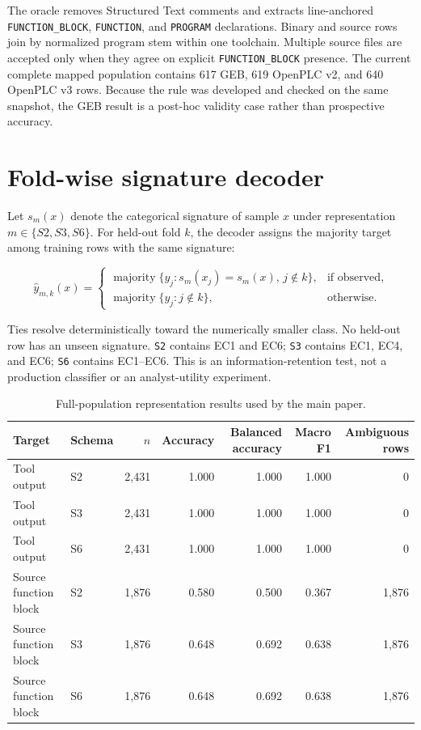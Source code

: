 \documentclass[manuscript,screen,review]{acmart}
\begin{document}
The oracle removes Structured Text comments and extracts line-anchored \texttt{FUNCTION\_BLOCK}, \texttt{FUNCTION}, and \texttt{PROGRAM} declarations. Binary and source rows join by normalized program stem within one toolchain. Multiple source files are accepted only when they agree on explicit \texttt{FUNCTION\_BLOCK} presence. The current complete mapped population contains 617 GEB, 619 OpenPLC v2, and 640 OpenPLC v3 rows. Because the rule was developed and checked on the same snapshot, the GEB result is a post-hoc validity case rather than prospective accuracy.

\section{Fold-wise signature decoder}

Let $s_m(x)$ denote the categorical signature of sample $x$ under representation $m\in\{S2,S3,S6\}$. For held-out fold $k$, the decoder assigns the majority target among training rows with the same signature:

\begin{equation}
\widehat{y}_{m,k}(x)=
\begin{cases}
\operatorname{majority}\{y_j:s_m(x_j)=s_m(x),\,j\notin k\}, & \text{if observed},\\
\operatorname{majority}\{y_j:j\notin k\}, & \text{otherwise}.
\end{cases}
\end{equation}

Ties resolve deterministically toward the numerically smaller class. No held-out row has an unseen signature. \texttt{S2} contains EC1 and EC6; \texttt{S3} contains EC1, EC4, and EC6; \texttt{S6} contains EC1--EC6. This is an information-retention test, not a production classifier or an analyst-utility experiment.

\begin{table}[t]
\centering
\small
\caption{Full-population representation results used by the main paper.}
\label{tab:schema_results}
\begin{tabularx}{\textwidth}{>{\raggedright\arraybackslash}Xlrrrrr}
\toprule
Target & Schema & $n$ & Accuracy & Balanced accuracy & Macro F1 & Ambiguous rows \\
\midrule
Tool output & S2 & 2,431 & 1.000 & 1.000 & 1.000 & 0 \\
Tool output & S3 & 2,431 & 1.000 & 1.000 & 1.000 & 0 \\
Tool output & S6 & 2,431 & 1.000 & 1.000 & 1.000 & 0 \\
Source function block & S2 & 1,876 & 0.580 & 0.500 & 0.367 & 1,876 \\
Source function block & S3 & 1,876 & 0.648 & 0.692 & 0.638 & 1,876 \\
Source function block & S6 & 1,876 & 0.648 & 0.692 & 0.638 & 1,876 \\
\bottomrule
\end{tabularx}
\end{table}
\end{document}

